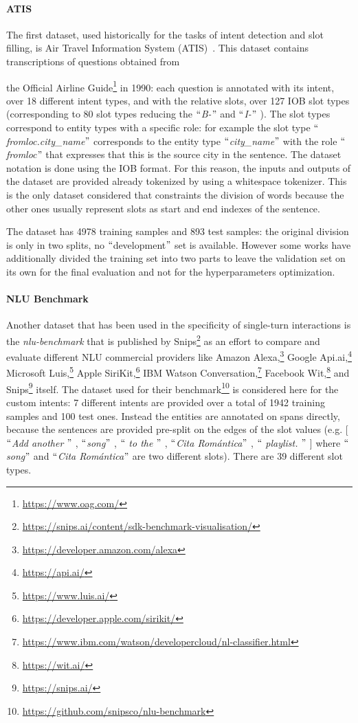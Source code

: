\paragraph{ATIS}
The first dataset, used historically for the tasks of intent detection and slot filling, is Air Travel Information System (ATIS)~\cite{hemphill1990atis}. This dataset contains transcriptions of questions obtained from

the Official Airline Guide\footnote{\url{https://www.oag.com/}} in 1990: each question is annotated with its intent, over 18 different intent types, and with the relative slots, over 127 IOB slot types (corresponding to 80 slot types reducing the $``$\textit{B-}$"$  and $``$\textit{I-}$"$ ). The slot types correspond to entity types with a specific role: for example the slot type $``$\textit{fromloc.city\_name}$"$  corresponds to the entity type $``$\textit{city\_name}$"$  with the role $``$\textit{fromloc}$"$  that expresses that this is the source city in the sentence. The dataset notation is done using the IOB format. For this reason, the inputs and outputs of the dataset are provided already tokenized by using a whitespace tokenizer. This is the only dataset considered that constraints the division of words because the other ones usually represent slots as start and end indexes of the sentence.

The dataset has 4978 training samples and 893 test samples: the original division is only in two splits, no $``$development$"$  set is available. However some works have additionally divided the training set into two parts to leave the validation set on its own for the final evaluation and not for the hyperparameters optimization.

\paragraph{NLU Benchmark}
Another dataset that has been used in the specificity of single-turn interactions is the \textit{nlu-benchmark} that is published by Snips\footnote{\url{https://snips.ai/content/sdk-benchmark-visualisation/}} as an effort to compare and evaluate different NLU commercial providers like Amazon Alexa,\footnote{\url{https://developer.amazon.com/alexa}} Google Api.ai,\footnote{\url{https://api.ai/}} Microsoft Luis,\footnote{\url{https://www.luis.ai/}} Apple SiriKit,\footnote{\url{https://developer.apple.com/sirikit/}} IBM Watson Conversation,\footnote{\url{https://www.ibm.com/watson/developercloud/nl-classifier.html}} Facebook Wit,\footnote{\url{https://wit.ai/}} and Snips\footnote{\url{https://snips.ai/}} itself. The dataset used for their benchmark\footnote{\url{https://github.com/snipsco/nlu-benchmark}} is considered here for the custom intents: 7 different intents are provided over a total of 1942 training samples and 100 test ones. Instead the entities are annotated on spans directly, because the sentences are provided pre-split on the edges of the slot values (e.g. [$``$\textit{Add another }$"$ , $``$\textit{song}$"$ , $``$\textit{ to the }$"$ , $``$\textit{Cita Romántica}$"$ , $``$\textit{ playlist. }$"$ ] where $``$\textit{song}$"$  and $``$\textit{Cita Romántica}$"$  are two different slots). There are 39 different slot types.

